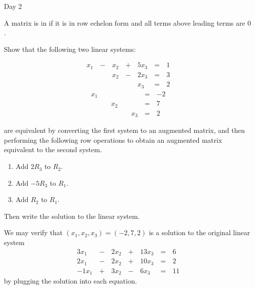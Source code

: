 \begin{applicationActivities}{Day 2}
\begin{definition}%
  A matrix is in  if it is in row echelon form
  and all terms above leading terms are \(0\). %
\end{definition}

\begin{activity}{10}
  Show that the following two linear systems:
  \begin{multicols}{2}\noindent
    \begin{alignat*}{4}
       x_1 &\,-\,&  x_2  &\,+\,&  5x_3 &\,=\,& 1 \\
           &\, \,&  x_2 &\,-\,&  2x_3 &\,=\,& 3 \\
           &\, \,&      &\, \,&   x_3 &\,=\,& 2
    \end{alignat*}
      \begin{alignat*}{4}
         x_1 &\, \,&      &\, \,&       &\,=\,& -2 \\
             &\, \,&  x_2 &\, \,&       &\,=\,& 7 \\
             &\, \,&      &\, \,&   x_3 &\,=\,& 2
      \end{alignat*}
  \end{multicols}
  are equivalent by converting the first system to an augmented matrix,
  and then performing the following row operations to obtain
  an augmented matrix equivalent to the second system.
  \begin{enumerate}
    \item Add \(2R_3\) to \(R_2\).
    \item Add \(-5R_3\) to \(R_1\).
    \item Add \(R_2\) to \(R_1\).
  \end{enumerate}
  Then write the solution to the linear system.
\end{activity}

\begin{remark}
  We may verify that \((x_1,x_2,x_3)=(-2,7,2)\) is a solution to the
  original linear system
    \begin{alignat*}{4}
      3x_1 &\,-\,& 2x_2 &\,+\,& 13x_3 &\,=\,& 6 \\
      2x_1 &\,-\,& 2x_2 &\,+\,& 10x_3 &\,=\,& 2 \\
     -1x_1 &\,+\,& 3x_2 &\,-\,&  6x_3 &\,=\,& 11
    \end{alignat*}
  by plugging the solution into each equation.
\end{remark}


\end{applicationActivities}
